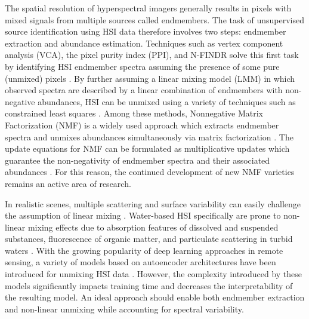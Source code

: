 \documentclass[remotesensing,article,submit,pdftex,moreauthors]{Definitions/mdpi}
\begin{document}
The spatial resolution of hyperspectral imagers generally results in pixels with mixed signals from multiple sources called endmembers. The task of unsupervised source identification using HSI data therefore involves two steps: endmember extraction and abundance estimation. Techniques such as vertex component analysis (VCA), the pixel purity index (PPI), and N-FINDR solve this first task by identifying HSI endmember spectra assuming the presence of some pure (unmixed) pixels \cite{vca-orig, ppi-orig, N-FINDR-orig}. By further assuming a linear mixing model (LMM) in which observed spectra are described by a linear combination of endmembers with non-negative abundances, HSI can be unmixed using a variety of techniques such as constrained least squares \cite{spectral-unmixing-orig, fcls-unmixing}. Among these methods, Nonnegative Matrix Factorization (NMF) is a widely used approach which extracts endmember spectra and unmixes abundances simultaneously via matrix factorization \cite{nmf-orig, unmixing-nmf-review, unmixing-nmf-review-2}. The update equations for NMF can be formulated as multiplicative updates which guarantee the non-negativity of endmember spectra and their associated abundances \cite{nmf-algorithms}.  For this reason, the continued development of new NMF varieties remains an active area of research.

In realistic scenes, multiple scattering and surface variability can easily challenge the assumption of linear mixing \cite{heylen2014review}. Water-based HSI specifically are prone to non-linear mixing effects due to absorption features of dissolved and suspended substances, fluorescence of organic matter, and particulate scattering in turbid waters \cite{hsi-absorption, hsi-fluorescence, hsi-turibidity}. With the growing popularity of deep learning approaches in remote sensing, a variety of models based on autoencoder architectures have been introduced for unmixing HSI data \cite{non-negative-autoencoders,su2019daen,borsoi2019deep,palsson2020convolutional}. However, the complexity introduced by these models significantly impacts training time and decreases the interpretability of the resulting model. An ideal approach should enable both endmember extraction and non-linear unmixing while accounting for spectral variability. 
\end{document}
